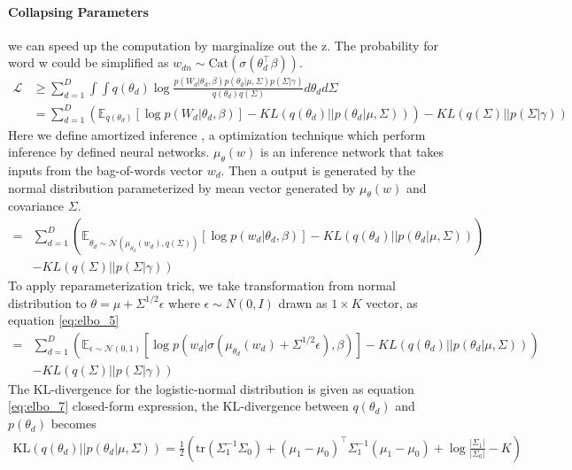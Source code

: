 \paragraph{Collapsing Parameters} we can speed up the computation by marginalize out the z. The probability for word w could be simplified as $ w_{dn}\sim\text{Cat}(\sigma(\theta^\top_{d}\beta)) $.
\begin{align}\label{eq:elbo_3}
\mathcal{L}&\geq\sum_{d=1}^{D}\int\int q(\theta_d)\log\frac{p(W_d|\theta_d,\beta)p(\theta_d|\mu,\Sigma)p(\Sigma|\gamma)}{q(\theta_d)q(\Sigma)}d\theta_d d\Sigma\\
&=\sum_{d=1}^{D}\left(\mathbb{E}_{q(\theta_d)}\left[\log p(W_d|\theta_d,\beta)\right]-KL(q(\theta_d)||p(\theta_d|\mu,\Sigma))\right)-KL(q(\Sigma)||p(\Sigma|\gamma))
\end{align}
Here we define amortized inference \cite{kingma_auto-encoding_2014}, a optimization technique which perform inference by defined neural networks. $ \mu_\theta(w) $ is an inference network that takes inputs from the bag-of-words vector $ w_d $. Then a output is generated by the normal distribution parameterized by mean vector generated by  $ \mu_\theta(w) $ and covariance $ \Sigma $.
\begin{align}\label{eq:elbo_4}
=&\sum_{d=1}^{D}\left(\mathbb{E}_{\theta_d\sim\mathcal{N}(\mu_{\theta_d}(w_d), q(\Sigma))}\left[\log p(w_d|\theta_d,\beta)\right]-KL(q(\theta_d)||p(\theta_d|\mu,\Sigma))\right)\\
&-KL(q(\Sigma)||p(\Sigma|\gamma))
\end{align}
To apply reparameterization trick, we take transformation from normal distribution to $ \theta=\mu+\Sigma^{1/2}\epsilon $ where $ \epsilon\sim N(0,I) $ drawn as $ 1\times K $ vector, as equation \ref{eq:elbo_5}
\begin{align}\label{eq:elbo_5}
=&\sum_{d=1}^{D}\left(\mathbb{E}_{\epsilon\sim\mathcal{N}(0,1)}\left[\log p(w_d|\sigma(\mu_{\theta_d}(w_d)+\Sigma^{1/2}\epsilon),\beta)\right]-KL(q(\theta_d)||p(\theta_d|\mu,\Sigma))\right)\\
&-KL(q(\Sigma)||p(\Sigma|\gamma))
\end{align}
The KL-divergence for the logistic-normal distribution is given as equation \ref{eq:elbo_7} closed-form expression, the KL-divergence between $ q(\theta_d) $ and $ p(\theta_d) $ becomes
\begin{align}\label{eq:elbo_7}
\text{KL}(q(\theta_d)||p(\theta_d|\mu,\Sigma))=\frac{1}{2}\left(\text{tr}(\Sigma_1^{-1}\Sigma_0)+(\mu_1-\mu_0)^\top\Sigma_1^{-1}(\mu_1-\mu_0)+\log\frac{|\Sigma_1|}{|\Sigma_0|}-K\right)
\end{align}
